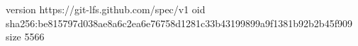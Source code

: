 version https://git-lfs.github.com/spec/v1
oid sha256:be815797d038ae8a6c2ea6e76758d1281c33b43199899a9f1381b92b2b45f909
size 5566
